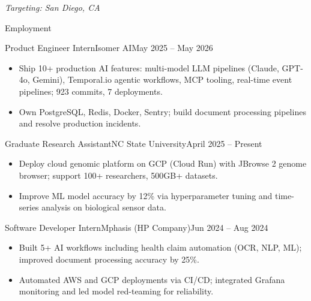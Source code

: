 \documentclass[]{mcdowellcv}
\begin{document}
\makeheader
\begin{center}\vspace{-12pt}\small\textit{Targeting: San Diego, CA}\end{center}\vspace{-10pt}

\begin{cvsection}{Employment}
  \begin{cvsubsection}{Product Engineer Intern}{Isomer AI}{May 2025 -- May 2026}
    \begin{itemize}
      \item Ship 10+ production AI features: multi-model LLM pipelines (Claude, GPT-4o, Gemini), Temporal.io agentic workflows, MCP tooling, real-time event pipelines; 923 commits, 7 deployments.
      \item Own PostgreSQL, Redis, Docker, Sentry; build document processing pipelines and resolve production incidents.
    \end{itemize}
    \vspace{-1.5pt}
  \end{cvsubsection}

  \begin{cvsubsection}{Graduate Research Assistant}{NC State University}{April 2025 -- Present}
    \begin{itemize}
      \item Deploy cloud genomic platform on GCP (Cloud Run) with JBrowse 2 genome browser; support 100+ researchers, 500GB+ datasets.
      \item Improve ML model accuracy by 12\% via hyperparameter tuning and time-series analysis on biological sensor data.
    \end{itemize}
    \vspace{-1.5pt}
  \end{cvsubsection}

  \begin{cvsubsection}{Software Developer Intern}{Mphasis (HP Company)}{Jun 2024 -- Aug 2024}
    \begin{itemize}
      \item Built 5+ AI workflows including health claim automation (OCR, NLP, ML); improved document processing accuracy by 25\%.
      \item Automated AWS and GCP deployments via CI/CD; integrated Grafana monitoring and led model red-teaming for reliability.
    \end{itemize}
    \vspace{-1.5pt}
  \end{cvsubsection}


\end{cvsection}
\end{document}
